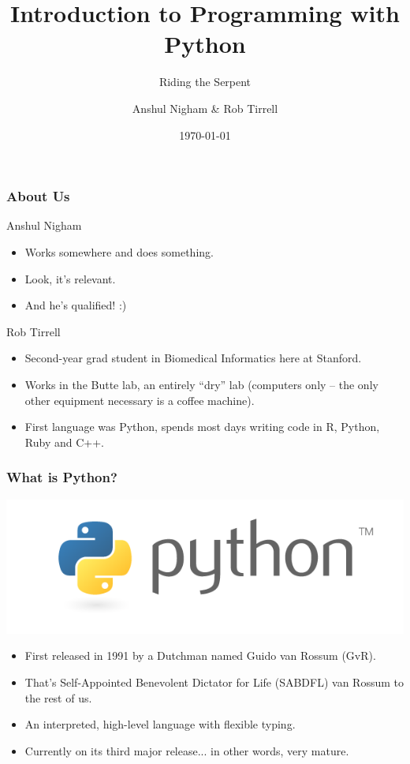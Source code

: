 \documentclass[10pt]{beamer}
\title{Introduction to Programming with Python}
\subtitle{Riding the Serpent}
\author{Anshul Nigham \& Rob Tirrell}
\date{\today}
\begin{document}
\begin{frame}
  \titlepage
\end{frame}

\begin{frame}
  \small
  \frametitle{About Us}
  \begin{block}{Anshul Nigham}
    \begin{itemize}
      \item Works somewhere and does something.
      \item Look, it's relevant.
      \item And he's qualified! :)
    \end{itemize}
  \end{block}
  \begin{block}{Rob Tirrell}
    \begin{itemize}
      \item Second-year grad student in Biomedical Informatics here at Stanford.
      \item Works in the Butte lab, an entirely ``dry'' lab (computers only -- the only other equipment necessary is a coffee machine).
      \item First language was Python, spends most days writing code in R, Python, Ruby and C++.
    \end{itemize}
  \end{block}
\end{frame}

\begin{frame}
  \frametitle{What is Python?}
  \centering
  \includegraphics[scale=0.5]{PythonLogo.png} \\
  \begin{itemize}
    \item First released in 1991 by a Dutchman named Guido van Rossum (GvR).
    \item That's Self-Appointed Benevolent Dictator for Life (SABDFL) van Rossum to the rest of us.
    \item An interpreted, high-level language with flexible typing.
    \item Currently on its third major release... in other words, very mature.
  \end{itemize}
\end{frame}
\end{document}
